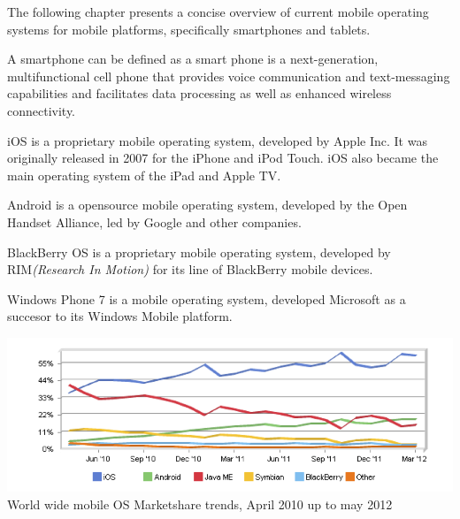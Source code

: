 
The following chapter presents a concise overview of current mobile operating systems for mobile platforms, specifically smartphones and tablets.

A smartphone can be defined as a smart phone is a next-generation, multifunctional cell phone that provides voice communication and text-messaging capabilities and facilitates data processing as well as enhanced wireless connectivity.\cite{Ni2006}

iOS is a proprietary mobile operating system, developed by Apple Inc. It was originally released in 2007 for the iPhone and iPod Touch. iOS also became the main operating system of the iPad and Apple TV.

Android is a opensource mobile operating system, developed by the Open Handset Alliance, led by Google and other companies.\cite{Inc.2012}

BlackBerry OS is a proprietary mobile operating system, developed by RIM\emph{(Research In Motion)} for its line of BlackBerry mobile devices.

Windows Phone 7 is a mobile operating system, developed Microsoft as a succesor to its Windows Mobile platform.




\begin{centering}
\includegraphics[scale=0.5]{images/marketsharetrendsApril10Tomay12.png}\\{World wide mobile OS Marketshare trends, April 2010 up to may 2012}\\
\end{centering}


